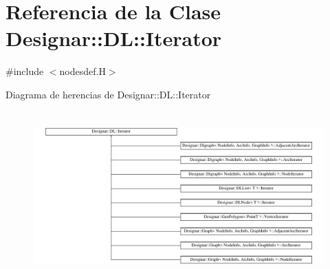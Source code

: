 \hypertarget{class_designar_1_1_d_l_1_1_iterator}{}\section{Referencia de la Clase Designar\+:\+:DL\+:\+:Iterator}
\label{class_designar_1_1_d_l_1_1_iterator}


{\ttfamily \#include $<$nodesdef.\+H$>$}

Diagrama de herencias de Designar\+:\+:DL\+:\+:Iterator\begin{figure}[H]
\begin{center}
\leavevmode
\includegraphics[height=6.511628cm]{class_designar_1_1_d_l_1_1_iterator}
\end{center}
\end{figure}
